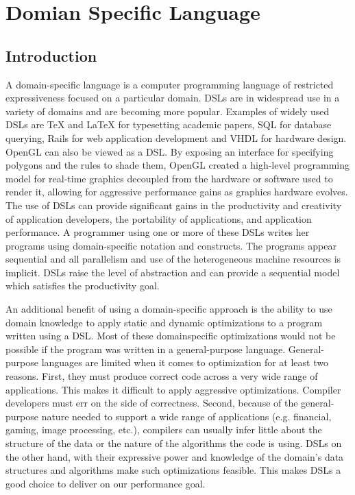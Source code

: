 \newpage

\section{Domian Specific Language}

\subsection{Introduction}

A domain-specific language is a computer programming language of restricted expressiveness focused on a particular 
domain\cite{van2000domain}. DSLs are in widespread use in a variety of domains and are becoming more popular. 
Examples of widely used
DSLs are TeX and LaTeX for typesetting academic papers, SQL for database querying, 
Rails for web application development and
VHDL for hardware design. OpenGL can also be viewed as a DSL.
By exposing an interface for specifying polygons and the rules to
shade them, OpenGL created a high-level programming model for
real-time graphics decoupled from the hardware or software used
to render it, allowing for aggressive performance gains as graphics
hardware evolves. The use of DSLs can provide significant gains in
the productivity and creativity of application developers, 
the portability of applications, and application performance.  A programmer using one or
more of these DSLs writes her programs using domain-specific notation and constructs.
 The programs appear sequential and all parallelism and use of the heterogeneous machine resources is implicit.
DSLs raise the level of abstraction and can provide a sequential
model which satisfies the productivity goal.

An additional benefit of using a domain-specific approach is the
ability to use domain knowledge to apply static and dynamic optimizations to a program written using a DSL.
 Most of these domainspecific optimizations would not be possible if the program was
written in a general-purpose language. General-purpose languages
are limited when it comes to optimization for at least two reasons.
First, they must produce correct code across a very wide range of
applications. This makes it difficult to apply aggressive optimizations. 
Compiler developers must err on the side of correctness. 
Second, because of the general-purpose nature needed to support a
wide range of applications (e.g. financial, gaming, image processing, etc.), 
compilers can usually infer little about the structure of
the data or the nature of the algorithms the code is using. DSLs on
the other hand, with their expressive power and knowledge of the
domain’s data structures and algorithms make such optimizations
feasible. This makes DSLs a good choice to deliver on our performance goal. 

